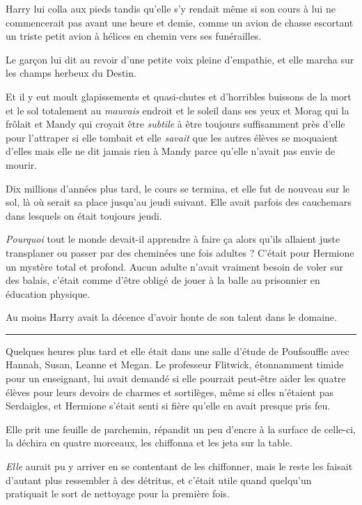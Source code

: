 Harry lui colla aux pieds tandis qu'elle s'y rendait même si son cours à lui ne commencerait pas avant une heure et demie, comme un avion de chasse escortant un triste petit avion à hélices en chemin vers ses funérailles.

Le garçon lui dit au revoir d'une petite voix pleine d'empathie, et elle marcha sur les champs herbeux du Destin.

Et il y eut moult glapissements et quasi-chutes et d'horribles buissons de la mort et le sol totalement au \emph{mauvais}  endroit et le soleil dans ses yeux et Morag qui la frôlait et Mandy qui croyait être \emph{subtile}  à être toujours suffisamment près d'elle pour l'attraper si elle tombait et elle \emph{savait}  que les autres élèves se moquaient d'elles mais elle ne dit jamais rien à Mandy parce qu'elle n'avait pas envie de mourir.

Dix millions d'années plus tard, le cours se termina, et elle fut de nouveau sur le sol, là où serait sa place jusqu'au jeudi suivant. Elle avait parfois des cauchemars dans lesquels on était toujours jeudi.

\emph{Pourquoi}  tout le monde devait-il apprendre à faire ça alors qu'ils allaient juste transplaner ou passer par des cheminées une fois adultes ? C'était pour Hermione un mystère total et profond. Aucun adulte n'avait vraiment besoin de voler sur des balais, c'était comme d'être obligé de jouer à la balle au prisonnier en éducation physique.

Au moins Harry avait la décence d'avoir honte de son talent dans le domaine.
\par\noindent\rule{\textwidth}{0.4pt}
Quelques heures plus tard et elle était dans une salle d'étude de Poufsouffle avec Hannah, Susan, Leanne et Megan. Le professeur Flitwick, étonnamment timide pour un enseignant, lui avait demandé si elle pourrait peut-être aider les quatre élèves pour leurs devoirs de charmes et sortilèges, même si elles n'étaient pas Serdaigles, et Hermione s'était senti si fière qu'elle en avait presque pris feu.

Elle prit une feuille de parchemin, répandit un peu d'encre à la surface de celle-ci, la déchira en quatre morceaux, les chiffonna et les jeta sur la table.

\emph{Elle}  aurait pu y arriver en se contentant de les chiffonner, mais le reste les faisait d'autant plus ressembler à des détritus, et c'était utile quand quelqu'un pratiquait le sort de nettoyage pour la première fois.

